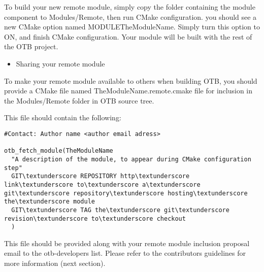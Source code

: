 To build your new remote module, simply copy the folder containing the module component to Modules/Remote, then run CMake configuration. you should see a new CMake option named MODULE\textunderscore TheModuleName. Simply turn this option to ON, and finish CMake configuration. Your module will be built with the rest of the OTB project. 

\begin{itemize}
       \item  Sharing your remote module 
\end{itemize}

To make your remote module available to others when building OTB, you should provide a CMake file named TheModuleName.remote.cmake file for inclusion in the Modules/Remote folder in OTB source tree.

This file should contain the following: 

\begin{verbatim}
#Contact: Author name <author email adress>

otb_fetch_module(TheModuleName
  "A description of the module, to appear during CMake configuration step"
  GIT\textunderscore REPOSITORY http\textunderscore link\textunderscore to\textunderscore a\textunderscore git\textunderscore repository\textunderscore hosting\textunderscore the\textunderscore module
  GIT\textunderscore TAG the\textunderscore git\textunderscore revision\textunderscore to\textunderscore checkout
  )
\end{verbatim}
This file should be provided along with your remote module inclusion proposal email to the otb-developers list. Please refer to the contributors guidelines for more information (next section). 

